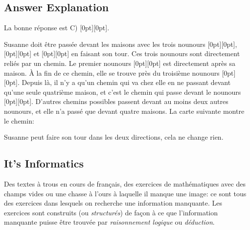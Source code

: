 \documentclass[a4paper,11pt]{report}
\newcommand{\taskGraphicsFolder}{..}
\begin{document}
\endgroup

\subsection*{Answer Explanation}

La bonne réponse est C) \raisebox{-0.5ex}[0pt][0pt]{}.

Susanne doit être passée devant les maisons avec les trois nounours \raisebox{-0.5ex}[0pt][0pt]{}, \raisebox{-0.5ex}[0pt][0pt]{} et \raisebox{-0.5ex}[0pt][0pt]{} en faisant son tour. Ces trois nounours sont directement reliés par un chemin. Le premier nounours \raisebox{-0.5ex}[0pt][0pt]{} est directement après sa maison. À la fin de ce chemin, elle se trouve près du troisième nounours \raisebox{-0.5ex}[0pt][0pt]{}. Depuis là, il n’y a qu’un chemin qui va chez elle en ne passant devant qu’une seule quatrième maison, et c’est le chemin qui passe devant le nounours \raisebox{-0.5ex}[0pt][0pt]{}. D’autres chemins possibles passent devant au moins deux autres nounours, et elle n’a passé que devant quatre maisons. La carte suivante montre le chemin:

{\centering%
\par}

Susanne peut faire son tour dans les deux directions, cela ne change rien.


\subsection*{It’s Informatics}

Des textes à trous en cours de français, des exercices de mathématiques avec des champs vides ou une chasse à l’ours à laquelle il manque une image: ce sont tous des exercices dans lesquels on recherche une information manquante. Les exercices sont construits (ou \emph{structurés}) de façon à ce que l’information manquante puisse être trouvée par \emph{raisonnement logique} ou \emph{déduction}.
\end{document}
